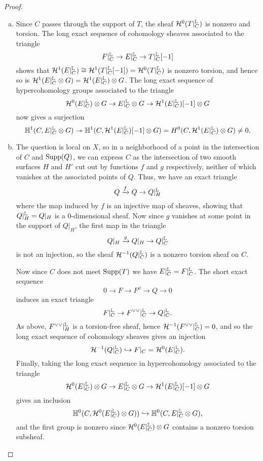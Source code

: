 \begin{proof}
    \begin{enumerate}[(a)]
    \item Since $C$ passes through the support of $T$, the sheaf $\mathcal{H}^0(T|^{\mathbb{L}}_C)$ is nonzero and torsion. The long exact sequence of cohomology sheaves associated to the triangle
    \[ F|^{\mathbb{L}}_C \to E|^{\mathbb{L}}_C \to T|^{\mathbb{L}}_C[-1] \]
    shows that $\mathcal{H}^1(E|^{\mathbb{L}}_C) \cong \mathcal{H}^1(T|^{\mathbb{L}}_C[-1]) = \mathcal{H}^0(T|^{\mathbb{L}}_C)$ is nonzero torsion, and hence so is $\mathcal{H}^1(E|^{\mathbb{L}}_C \otimes G) = \mathcal{H}^1(E|^{\mathbb{L}}_C) \otimes G$. The long exact sequence of hypercohomology groups associated to the triangle 
    \[ \mathcal{H}^0(E|^{\mathbb{L}}_C) \otimes G \to E|^{\mathbb{L}}_C \otimes G \to \mathcal{H}^1(E|^{\mathbb{L}}_C)[-1] \otimes G \]
    now gives a surjection
    \[ \mathbb{H}^1(C, E|^{\mathbb{L}}_C \otimes G) \twoheadrightarrow \mathbb{H}^1(C, \mathcal{H}^1(E|^{\mathbb{L}}_C)[-1] \otimes G) = H^0(C, \mathcal{H}^1(E|^{\mathbb{L}}_C) \otimes G) \neq 0. \]
    
    \item The question is local on $X$, so in a neighborhood of a point in the intersection of $C$ and $\operatorname{\mathrm{Supp}}(Q)$, we can express $C$ as the intersection of two smooth surfaces $H$ and $H'$ cut out by functions $f$ and $g$ respectively, neither of which vanishes at the associated points of $Q$. Thus, we have an exact triangle
    \[ Q \xrightarrow{f} Q \to Q|^{\mathbb{L}}_H \]
    where the map induced by $f$ is an injective map of sheaves, showing that $Q|^{\mathbb{L}}_H = Q|_H$ is a 0-dimensional sheaf. Now since $g$ vanishes at some point in the support of $Q|_H$, the first map in the triangle
    \[ Q|_H \xrightarrow{g} Q|_H \to Q|^{\mathbb{L}}_C \]
    is not an injection, so the sheaf $\mathcal{H}^{-1}(Q|^{\mathbb{L}}_C)$ is a nonzero torsion sheaf on $C$.
    
    Now since $C$ does not meet $\operatorname{\mathrm{Supp}}(T)$ we have $E|^{\mathbb{L}}_C = F|^{\mathbb{L}}_C$. The short exact sequence
    \[ 0 \to F \to F^\dd \to Q \to 0 \]
    induces an exact triangle
    \[ F|^{\mathbb{L}}_C \to F^{\vee\vee}|^{\mathbb{L}}_C \to Q|^{\mathbb{L}}_C. \]
    As above, $F^{\vee\vee}|^{\mathbb{L}}_H$ is a torsion-free sheaf, hence $\mathcal{H}^{-1}(F^{\vee\vee}|^{\mathbb{L}}_C) = 0$, and so the long exact sequence of cohomology sheaves gives an injection
    \[ \mathcal{H}^{-1}(Q|^{\mathbb{L}}_C) \hookrightarrow F|_C = \mathcal{H}^0(E|^{\mathbb{L}}_C). \]
    Finally, taking the long exact sequence in hypercohomology associated to the triangle
    \[ \mathcal{H}^0(E|^{\mathbb{L}}_C) \otimes G \to E|^{\mathbb{L}}_C \otimes G \to \mathcal{H}^1(E|^{\mathbb{L}}_C)[-1] \otimes G \]
    gives an inclusion 
    \[ \mathbb{H}^0(C, \mathcal{H}^0(E|^{\mathbb{L}}_C) \otimes G)) \hookrightarrow \mathbb{H}^0(C, E|^{\mathbb{L}}_C \otimes G), \]
    and the first group is nonzero since $\mathcal{H}^0(E|^{\mathbb{L}}_C) \otimes G$ contains a nonzero torsion subsheaf.
\end{enumerate}
\end{proof}



